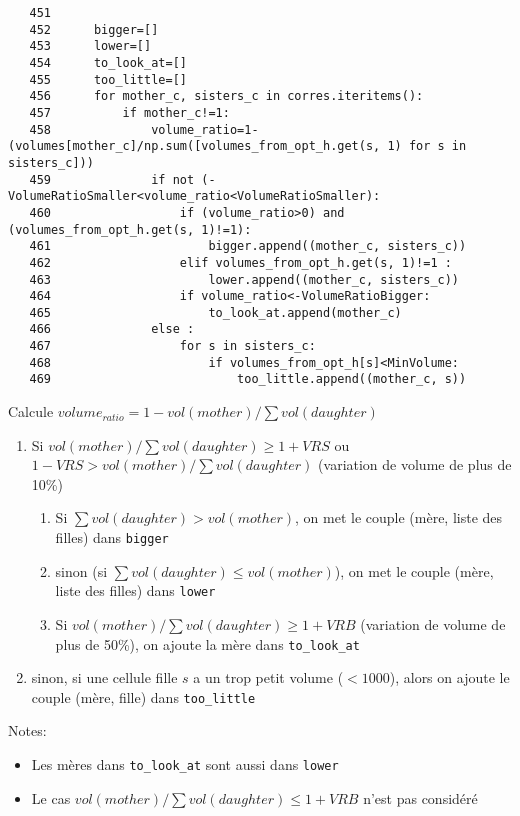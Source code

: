 \documentclass{article}
\def \mycolor {red}
\begin{document}
\color{black}
\begin{verbatim} 
   451	
   452	    bigger=[]
   453	    lower=[]
   454	    to_look_at=[]
   455	    too_little=[]
   456	    for mother_c, sisters_c in corres.iteritems():
   457	        if mother_c!=1:
   458	            volume_ratio=1-(volumes[mother_c]/np.sum([volumes_from_opt_h.get(s, 1) for s in sisters_c]))
   459	            if not (-VolumeRatioSmaller<volume_ratio<VolumeRatioSmaller):
   460	                if (volume_ratio>0) and (volumes_from_opt_h.get(s, 1)!=1):
   461	                    bigger.append((mother_c, sisters_c))
   462	                elif volumes_from_opt_h.get(s, 1)!=1 :
   463	                    lower.append((mother_c, sisters_c))
   464	                if volume_ratio<-VolumeRatioBigger:
   465	                    to_look_at.append(mother_c)
   466	            else :
   467	                for s in sisters_c:
   468	                    if volumes_from_opt_h[s]<MinVolume:
   469	                        too_little.append((mother_c, s))
\end{verbatim} 
\color{\mycolor}
Calcule $volume_{ratio} = 1 - vol(mother) / \sum vol(daughter)$
\begin{enumerate}
\itemsep -0.5ex
\item Si $vol(mother) / \sum vol(daughter) \geq 1 + VRS$ ou $1 - VRS > vol(mother) / \sum vol(daughter)$ (variation de volume de plus de 10\%)
\begin{enumerate}
\item Si $\sum vol(daughter) > vol(mother)$, on met le couple (m\`ere, liste des filles) dans \verb|bigger|
\item sinon (si $\sum vol(daughter) \leq vol(mother)$), on met le couple (m\`ere, liste des filles) dans \verb|lower|
\item Si $vol(mother) / \sum vol(daughter) \geq 1 + VRB$ (variation de volume de plus de 50\%), on ajoute la m\`ere dans \verb|to_look_at|
\end{enumerate}
\item sinon, si une cellule fille $s$ a un trop petit volume ($<1000$), alors on ajoute le couple (m\`ere, fille) dans \verb|too_little|
\end{enumerate}
Notes:
\begin{itemize}
\itemsep -0.5ex
\item Les m\`eres dans  \verb|to_look_at| sont aussi dans \verb|lower|
\item Le cas $vol(mother) / \sum vol(daughter) \leq 1 + VRB$ n'est pas consid\'er\'e
\end{itemize}
\end{document}
